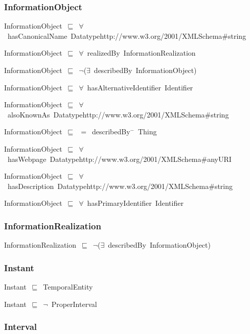 \documentclass{article}
\begin{document}
\subsubsection*{InformationObject}

InformationObject~\ensuremath{\sqsubseteq}~\ensuremath{\forall}~hasCanonicalName~Datatypehttp://www.w3.org/2001/XMLSchema#string~

InformationObject~\ensuremath{\sqsubseteq}~\ensuremath{\forall}~realizedBy~InformationRealization~

InformationObject~\ensuremath{\sqsubseteq}~\ensuremath{\lnot}(\ensuremath{\exists}~describedBy~InformationObject)~

InformationObject~\ensuremath{\sqsubseteq}~\ensuremath{\forall}~hasAlternativeIdentifier~Identifier~

InformationObject~\ensuremath{\sqsubseteq}~\ensuremath{\forall}~alsoKnownAs~Datatypehttp://www.w3.org/2001/XMLSchema#string~

InformationObject~\ensuremath{\sqsubseteq}~\ensuremath{=}~describedBy\ensuremath{^-}~Thing~

InformationObject~\ensuremath{\sqsubseteq}~\ensuremath{\forall}~hasWebpage~Datatypehttp://www.w3.org/2001/XMLSchema#anyURI~

InformationObject~\ensuremath{\sqsubseteq}~\ensuremath{\forall}~hasDescription~Datatypehttp://www.w3.org/2001/XMLSchema#string~

InformationObject~\ensuremath{\sqsubseteq}~\ensuremath{\forall}~hasPrimaryIdentifier~Identifier~

\subsubsection*{InformationRealization}

InformationRealization~\ensuremath{\sqsubseteq}~\ensuremath{\lnot}(\ensuremath{\exists}~describedBy~InformationObject)~

\subsubsection*{Instant}

Instant~\ensuremath{\sqsubseteq}~TemporalEntity~

Instant~\ensuremath{\sqsubseteq}~\ensuremath{\lnot}~ProperInterval

\subsubsection*{Interval}
\end{document}
